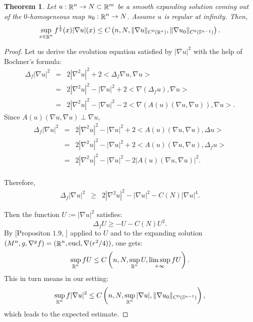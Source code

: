 \documentclass[a4paper,11pt,reqno]{amsart}
\newtheorem{theo}[defn]{Theorem}
\def\eucl{\mathop{\rm eucl}\nolimits}
\def\eucl{\mathop{\rm eucl}\nolimits}
\def\R{\mathop{\rm \mathbb{R}}\nolimits}
\begin{document}
\begin{theo}\label{Asy-Est-Grad-Theo}
Let $u:\R^n\rightarrow N\subset \R^m$ be a smooth expanding solution coming out of the $0$-homogeneous map $u_0:\R^n\rightarrow N$. Assume $u$ is regular at infinity. Then, 
\begin{eqnarray*}
\sup_{x\in\R^n}f^{\frac{1}{2}}(x)|\nabla u|(x)\leq C\left(n,N,\|\nabla u\|_{C^0(\R^n)},\|\nabla u_0\|_{C^0(\mathbb{S}^{n-1})}\right).
\end{eqnarray*}

\end{theo}

\begin{proof}
Let us derive the evolution equation satisfied by $|\nabla u|^2$ with the help of Bochner's formula:
\begin{eqnarray*}
\Delta_f|\nabla u|^2&=&2|\nabla^2u|^2+2<\Delta_f\nabla u,\nabla u>\\
&=&2|\nabla^2u|^2-|\nabla u|^2+2<\nabla(\Delta_f u),\nabla u>\\
&=&2|\nabla^2u|^2-|\nabla u|^2-2<\nabla(A(u)(\nabla u,\nabla u)),\nabla u>.
\end{eqnarray*}
Since $A(u)(\nabla u,\nabla u)\perp\nabla u$,
\begin{eqnarray*}
\Delta_f|\nabla u|^2&=&2|\nabla^2u|^2-|\nabla u|^2+2<A(u)(\nabla u,\nabla u),\Delta u>\\
&=&2|\nabla^2u|^2-|\nabla u|^2+2<A(u)(\nabla u,\nabla u),\Delta_f u>\\
&=&2|\nabla^2u|^2-|\nabla u|^2-2\left|A(u)(\nabla u,\nabla u)\right|^2.\\
\end{eqnarray*}

Therefore,
\begin{eqnarray*}
\Delta_f|\nabla u|^2&\geq&2|\nabla^2u|^2-|\nabla u|^2-C(N)|\nabla u|^4.
\end{eqnarray*}

Then the function $U:=|\nabla u|^2$ satisfies: $$\Delta_fU\geq -U-C(N)U^2.$$
By [Propositon $1.9$, \cite{Der-Asy-Com-Egs}] applied to $U$ and to the expanding solution $(M^n,g,\nabla^gf)=(\R^n,\eucl,\nabla(r^2/4))$, one gets:
\begin{eqnarray}
\sup_{\R^n}fU\leq C\left(n,N,\sup_{\R^n}U,\limsup_{+\infty}fU\right).
\end{eqnarray}
This in turn means in our setting:
\begin{eqnarray*}
\sup_{\R^n}f|\nabla u|^2\leq C\left(n,N,\sup_{\R^n}|\nabla u|,\|\nabla u_0\|_{C^0(\mathbb{S}^{n-1})}\right),
\end{eqnarray*}
which leads to the expected estimate.

\end{proof}
\end{document}
